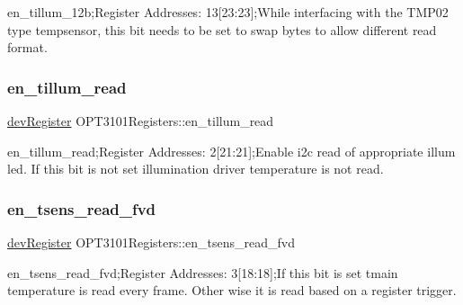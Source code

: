 en\+\_\+tillum\+\_\+12b;Register Addresses\+: 13\mbox{[}23\+:23\mbox{]};While interfacing with the T\+M\+P02 type tempsensor, this bit needs to be set to swap bytes to allow different read format. 

\mbox{\label{class_o_p_t3101_registers_a10a311b8708c5d99715e63ff83ac8fa9}} 
\subsubsection{\texorpdfstring{en\+\_\+tillum\+\_\+read}{en\_tillum\_read}}
{\footnotesize\ttfamily \mbox{\hyperlink{classdev_register}{dev\+Register}} O\+P\+T3101\+Registers\+::en\+\_\+tillum\+\_\+read}



en\+\_\+tillum\+\_\+read;Register Addresses\+: 2\mbox{[}21\+:21\mbox{]};Enable i2c read of appropriate illum led. If this bit is not set illumination driver temperature is not read. 

\mbox{\label{class_o_p_t3101_registers_aaab7fe3c1c08bac11e1a6c640105ef59}} 
\subsubsection{\texorpdfstring{en\+\_\+tsens\+\_\+read\+\_\+fvd}{en\_tsens\_read\_fvd}}
{\footnotesize\ttfamily \mbox{\hyperlink{classdev_register}{dev\+Register}} O\+P\+T3101\+Registers\+::en\+\_\+tsens\+\_\+read\+\_\+fvd}



en\+\_\+tsens\+\_\+read\+\_\+fvd;Register Addresses\+: 3\mbox{[}18\+:18\mbox{]};If this bit is set tmain temperature is read every frame. Other wise it is read based on a register trigger. 

\mbox{\label{class_o_p_t3101_registers_a6aec1f1dcdba6a03e15b875514747c00}} 
